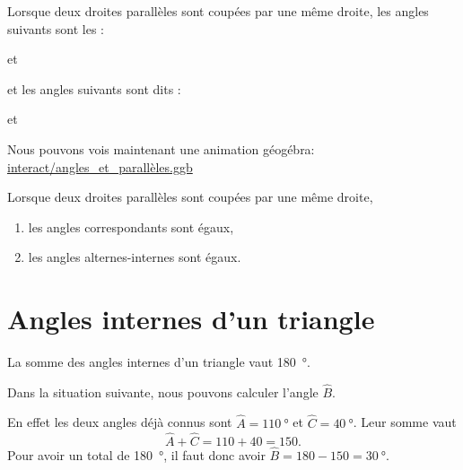 \begin{definition}
    Lorsque deux droites parallèles sont coupées par une même droite, les angles suivants sont les  :

\begin{center}
   
   \hfill et\hfill
   
\end{center}

et les angles suivants sont dits  :

\begin{center}
   
   \hfill et\hfill
   
\end{center}
\end{definition}

Nous pouvons vois maintenant une animation géogébra:
\url{interact/angles_et_parallèles.ggb}

\begin{propriete}
    Lorsque deux droites parallèles sont coupées par une même droite,
    \begin{enumerate}
        \item
            les angles correspondants sont égaux,
        \item
            les angles alternes-internes sont égaux.
    \end{enumerate}
\end{propriete}


\section{Angles internes d'un triangle}


\begin{theorem}
    La somme des angles internes d'un triangle vaut \SI{180}{\degree}.
\end{theorem}

\begin{example}
    Dans la situation suivante, nous pouvons calculer l'angle \( \hat B\).

    \begin{center}
        
    \end{center}
    
    En effet les deux angles déjà connus sont \( \hat A=\SI{110}{\degree}\) et \( \hat C=\SI{40}{\degree}\). Leur somme vaut
    \begin{equation}
        \hat A+\hat C=110+40=150.
    \end{equation}
    Pour avoir un total de \SI{180}{\degree}, il faut donc avoir \( \hat B=180-150=\SI{30}{\degree}\).
\end{example}

